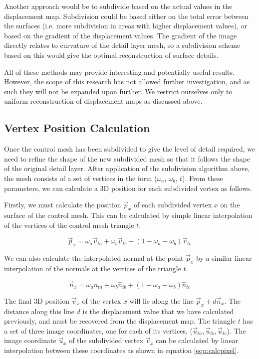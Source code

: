 Another approach would be to subdivide based on the actual values in the displacement map. Subdivision could be based either on the total error between the surfaces (i.e. more subdivision in areas with higher displacement values), or based on the gradient of the displacement values. The gradient of the image directly relates to curvature of the detail layer mesh, so a subdivision scheme based on this would give the optimal reconstruction of surface details.

All of these methods may provide interesting and potentially useful results. However, the scope of this research has not allowed further investigation, and as such they will not be expanded upon further. We restrict ourselves only to uniform reconstruction of displacement maps as discussed above.

\subsection{\label{sec:dispmapanim:reconstruction:sampling}Vertex Position Calculation}

Once the control mesh has been subdivided to give the level of detail required, we need to refine the shape of the new subdivided mesh so that it follows the shape of the original detail layer. After application of the subdivision algorithm above, the mesh consists of a set of vertices in the form ($\omega_a$, $\omega_b$, $t$). From these parameters, we can calculate a 3D position for each subdivided vertex as follows. 

Firstly, we must calculate the position $\vec{p}_x$ of each subdivided vertex $x$ on the surface of the control mesh. This can be calculated by simple linear interpolation of the vertices of the control mesh triangle $t$.

\begin{equation}
\vec{p}_x = \omega_a \vec{v}_{ta} + \omega_b \vec{v}_{tb} + (1 - \omega_a - \omega_b) \vec{v}_{tc}
\end{equation}

We can also calculate the interpolated normal at the point $\vec{p}_x$ by a similar linear interpolation of the normals at the vertices of the triangle $t$.

\begin{equation}
\vec{n}_x = \omega_a \hat{n}_{ta} + \omega_b \hat{n}_{tb} + (1 - \omega_a - \omega_b) \hat{n}_{tc}
\end{equation}

The final 3D position $\vec{v}_x$ of the vertex $x$ will lie along the line $\vec{p}_x + d\vec{n}_x$. The distance along this line $d$ is the displacement value that we have calculated previously, and must be recovered from the displacement map. The triangle $t$ has a set of three image coordinates, one for each of its vertices, ($\vec{u}_{ta},\vec{u}_{tb},\vec{u}_{tc}$). The image coordinate $\vec{u}_x$ of the subdivided vertex $\vec{v}_x$ can be calculated by linear interpolation between these coordinates as shown in equation \ref{eqn:calcpixel}.


